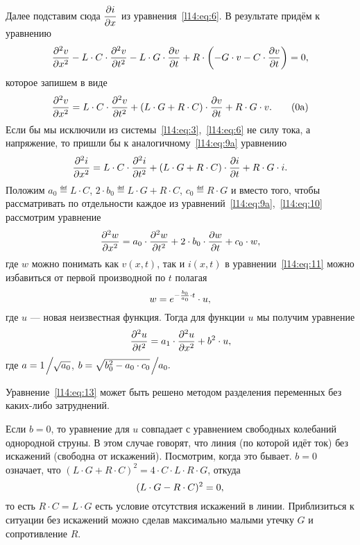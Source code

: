 Далее подставим сюда $\displaystyle\frac{\partial i}{\partial x}$ из уравнения~\eqref{l14:eq:6}. В результате придём к уравнению
\begin{equation*}
	\hfill \pdder{v}{x}-L\cdot C\cdot\pdder{v}{t}-L\cdot G\cdot \pder{v}{t}+R\cdot \left(-G\cdot v-C\cdot\pder{v}{t}\right)=0,\hfill
\end{equation*}  
которое запишем в виде
\begin{equation}\label{l14:eq:9a}
	\hfill \pdder{v}{x}=L\cdot C\cdot\pdder{v}{t}+(L\cdot G+R\cdot C)\cdot\pder{v}{t}+R\cdot G\cdot v.\tag{\theequation a}\hfill
\end{equation} 
Если бы мы исключили из системы~\eqref{l14:eq:3},~\eqref{l14:eq:6} не силу тока, а напряжение, то пришли бы к аналогичному~\eqref{l14:eq:9a} уравнению
\begin{equation}\label{l14:eq:10}
	\hfill \pdder{i}{x}=L\cdot C\cdot\pdder{i}{t}+(L\cdot G +R\cdot C)\cdot\pder{i}{t}+R\cdot G\cdot i.\hfill
\end{equation} 
Положим $a_0\eqdef L\cdot C$, $2\cdot b_0\eqdef L\cdot G +R\cdot C$, $c_0\eqdef R\cdot G$ и вместо того, чтобы рассматривать по отдельности каждое из уравнений~\eqref{l14:eq:9a},~\eqref{l14:eq:10} рассмотрим уравнение 
\begin{equation}\label{l14:eq:11}
	\hfill \pdder{w}{x}=a_0\cdot\pdder{w}{t}+2\cdot b_0\cdot\pder{w}{t}+c_0\cdot w,\hfill
\end{equation} 
где $w$ можно понимать как $v(x,t)$, так и $i(x,t)$ в уравнении~\eqref{l14:eq:11} можно избавиться от первой производной по $t$ полагая 
\begin{equation}\label{l14:eq:12}
	\hfill w=e^{-\frac{b_0}{a_0}\cdot t}\cdot u, \hfill
\end{equation}
где $u$ --- новая неизвестная функция. Тогда для функции $u$ мы получим уравнение
\begin{equation}\label{l14:eq:13}
	\hfill \pdder{u}{t}=a_1\cdot\pdder{u}{x}+b^2\cdot u,\hfill
\end{equation} 
где $a=1\!\Bigm/\!\!\sqrt{a_0}$, $b=\sqrt{b_0^2-a_0\cdot c_0}\!\Bigm/\!\!a_0.$

Уравнение~\eqref{l14:eq:13} может быть решено методом разделения переменных без каких-либо затруднений.

Если $b=0$, то уравнение для $u$ совпадает с уравнением свободных колебаний однородной струны. В этом случае говорят, что линия (по которой идёт ток) без искажений (свободна от искажений). Посмотрим, когда это бывает. $b=0$ означает, что $(L\cdot G+R\cdot C)^2=4\cdot C\cdot L\cdot R\cdot G$, откуда 
\begin{equation*}
	\hfill(L\cdot G-R\cdot C)^2=0,\hfill
\end{equation*}
то есть $R\cdot C=L\cdot G$ есть условие отсутствия искажений в линии. Приблизиться к ситуации без искажений можно сделав максимально малыми утечку $G$ и сопротивление $R$.
